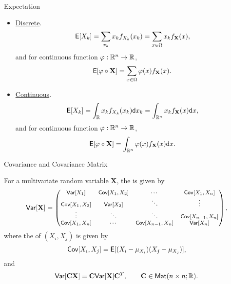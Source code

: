 \begin{frame}{Expectation}

\begin{itemize}
	\item \underline{Discrete}.
	\begin{align*}
	\mathsf{E}[X_k] = \sum_{x_k}x_kf_{X_k}(x_k) = \sum_{x\in \Omega} x_k f_{\mathbf{X}}(x),
	\end{align*}
	and for continuous function $\varphi: \mathbb{R}^n\rightarrow \mathbb{R}$,
	\begin{align*}
	\mathsf{E}[\varphi\circ \mathbf{X}] = \sum_{x\in \Omega} \varphi(x)f_{\mathbf{X}}(x).
	\end{align*}
	\item \underline{Continuous}.
	\begin{align*}
	\mathsf{E}[X_k] = \int_{\mathbb{R}} x_k f_{X_k}(x_k) \mathsf{d}x_k = \int_{\mathbb{R}^n} x_kf_{\mathbf{X}}(x)\mathsf{d}x,
	\end{align*}
	and for continuous function $\varphi: \mathbb{R}^n\rightarrow \mathbb{R}$,
	\begin{align*}
	\mathsf{E}[\varphi\circ \mathbf{X}] = \int_{\mathbb{R}^n} \varphi(x)f_{\mathbf{X}}(x)\mathsf{d}x.
	\end{align*}
\end{itemize}

\end{frame}

\begin{frame}{Covariance and Covariance Matrix}

\justifying
{} For a multivariate random variable $\mathbf{X}$, the  is given by
\begin{align*}
\footnotesize
\mathsf{Var}[\mathbf{X}] = \begin{pmatrix}
\mathsf{Var}[X_1] & \mathsf{Cov}[X_1, X_2] & \cdots & \mathsf{Cov}[X_1, X_n] \\
\mathsf{Cov}[X_1, X_2] & \mathsf{Var}[X_2] & \ddots & \vdots \\
\vdots & \ddots & \ddots & \mathsf{Cov}[X_{n-1}, X_n] \\
\mathsf{Cov}[X_1, X_n] & \cdots & \mathsf{Cov}[X_{n-1}, X_n] & \mathsf{Var}[X_n]
\end{pmatrix},
\end{align*}
where the  of $(X_i, X_j)$ is given by
\begin{align*}
\mathsf{Cov}[X_i, X_j] = \mathsf{E}[(X_i-\mu_{X_i})(X_j-\mu_{X_j})],
\end{align*}
and
\begin{align*}
\mathsf{Var}[\mathbf{C}\mathbf{X}] = \mathbf{C}\mathsf{Var}[\mathbf{X}]\mathbf{C}^T, \qquad \mathbf{C} \in \mathsf{Mat}(n\times n; \mathbb{R}).
\end{align*}

\end{frame}


